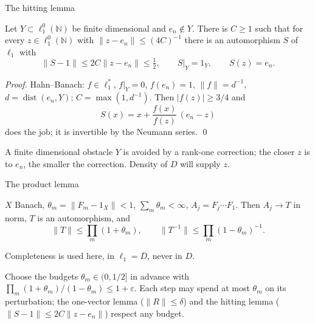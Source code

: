 \documentclass[10pt,aspectratio=169]{beamer}
\newcommand{\lo}[1]{\ell_1^0(#1)}
\newcommand{\NN}{\mathbb N}
\begin{document}
\begin{frame}{The hitting lemma}
  \begin{lemma}[hitting]
    Let $Y\subset\lo\NN$ be finite dimensional and $e_n\notin Y$. There is $C\ge1$
    such that for every $z\in\lo\NN$ with $\|z-e_n\|\le{(4C)}^{-1}$ there is an
    automorphism $S$ of $\ell_1$ with
    \[
      \|S-1\|\le2C\|z-e_n\|\le\tfrac12,\qquad S|_Y=1_Y,\qquad S(z)=e_n .
    \]
  \end{lemma}
  \textit{Proof.} Hahn--Banach: $f\in\ell_1^*$, $f|_Y=0$, $f(e_n)=1$,
  $\|f\|=d^{-1}$, $d=\operatorname{dist}(e_n,Y)$; $C=\max(1,d^{-1})$. Then
  $|f(z)|\ge3/4$ and
  \[
    S(x)=x+\frac{f(x)}{f(z)}\,(e_n-z)
  \]
  does the job; it is invertible by the Neumann series. \qed
  \medskip

  A finite dimensional obstacle $Y$ is avoided by a rank-one correction; the
  closer $z$ is to $e_n$, the smaller the correction. Density of $D$ will
  supply $z$.
\end{frame}

\begin{frame}{The product lemma}
  \begin{lemma}[product]
    $X$ Banach, $\theta_m=\|F_m-1_X\|<1$, $\sum_m\theta_m<\infty$,
    $A_j=F_j\cdots F_1$. Then $A_j\to T$ in norm, $T$ is an automorphism, and
    \[
      \|T\|\le\prod_m(1+\theta_m),\qquad \|T^{-1}\|\le\prod_m{(1-\theta_m)}^{-1}.
    \]
  \end{lemma}
  Completeness is used here, in $\ell_1=\overline D$, never in $D$.
  \medskip

  Choose the budgets $\theta_m\in(0,1/2]$ in advance with
  $\prod_m(1+\theta_m)/(1-\theta_m)\le1+\varepsilon$. Each step may spend at
  most $\theta_m$ on its perturbation; the one-vector lemma ($\|R\|\le\delta$)
  and the hitting lemma ($\|S-1\|\le2C\|z-e_n\|$) respect any budget.
\end{frame}
\end{document}
